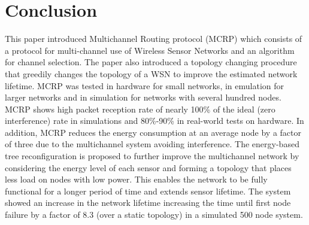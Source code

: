 \section{Conclusion}
\label{Conclusion}

This paper introduced Multichannel Routing protocol (MCRP) which consists of a protocol for multi-channel use of Wireless Sensor Networks and an algorithm for channel selection. The paper also introduced a topology changing procedure that greedily changes the topology of a WSN to improve the estimated network lifetime.  MCRP was tested in hardware for small networks, in emulation for larger networks and in simulation for networks with several hundred nodes.  MCRP shows high packet reception rate of nearly 100\% of the ideal (zero interference) rate in simulations and 80\%-90\% in real-world tests on hardware. In addition, MCRP reduces the energy consumption at an average node by a factor of three due to the multichannel system avoiding interference.  The energy-based tree reconfiguration is proposed to further improve the multichannel network by considering the energy level of each sensor and forming a topology that places less load on nodes with low power. 
This enables the network to be fully functional for a longer period of time and extends sensor lifetime.  The system showed an increase in the network lifetime increasing the time until first node failure by a factor of 8.3 (over a static topology) in a simulated 500 node system.
